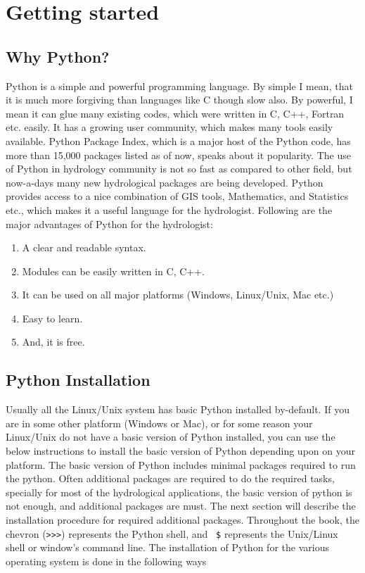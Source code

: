 \documentclass[10pt]{book}
\begin{document}
\mainmatter

\chapter{Getting started}

\section{Why Python?}
Python is a simple and powerful programming language. 
By simple I mean, that it is much more forgiving than languages like 
C though slow also. By powerful, I mean it can glue many existing codes,  
which were written in C, C++, Fortran etc. easily. 
It has a growing user community, which makes many tools easily available. 
Python Package Index, which is a major host of the Python code, 
has more than 15,000 packages listed as of now, speaks about it popularity. 
The use of Python in hydrology community is not so fast as compared to other field, 
but now-a-days many new hydrological packages are being developed. 
Python provides access to a nice combination of GIS tools, Mathematics, 
and Statistics etc., which makes it a useful language for the hydrologist. 
Following are the major advantages of Python for the hydrologist:
\begin{enumerate}
\item A clear and readable syntax. \
\item Modules can be easily written in C, C++. \
\item It can be used on all major platforms (Windows, Linux/Unix, Mac etc.) \
\item Easy to learn. \
\item And, it is free. \
\end{enumerate}

\index{Why Python}

\section{Python Installation}
Usually all the Linux/Unix system has basic Python installed by-default. If you are in
some other platform (Windows or Mac), or for some reason your Linux/Unix do not have 
a basic version of Python installed, you can use the below instructions to install the 
basic version of Python depending upon on your platform.  
The basic version of Python includes minimal packages required to run the python. 
Often additional packages are required to do the required tasks, specially for most 
of the hydrological applications, the basic version of python is not enough, 
and additional packages are must. The next section will describe the installation 
procedure for required additional packages. 
Throughout the book, the chevron (\verb">>>") represents the Python shell, 
and {\verb" $"} represents the Unix/Linux shell or window's command line. 
The installation of Python for the various operating system is done in the 
following ways
\end{document}
